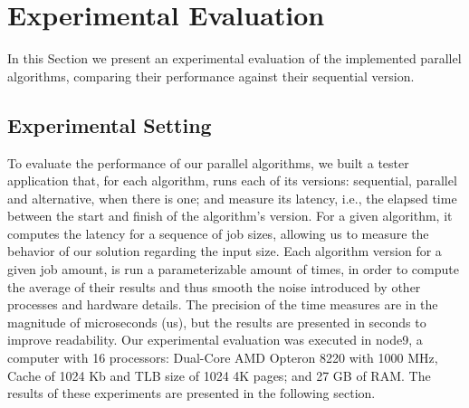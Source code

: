 \documentclass[conference,compsoc]{IEEEtran}
\begin{document}


\section{Experimental Evaluation} \label{Experimental_Eval}
In this Section we present an experimental evaluation of the implemented parallel algorithms, comparing their performance against their sequential version.

\subsection{Experimental Setting}


To evaluate the performance of our parallel algorithms, we built a tester application that, for each algorithm, runs each of its versions: sequential, parallel and alternative, when there is one; and measure its latency, i.e., the elapsed time between the start and finish of the algorithm's version. For a given algorithm, it computes the latency for a sequence of job sizes, allowing us to measure the behavior of our solution regarding the input size. Each algorithm version for a given job amount, is run a parameterizable amount of times, in order to compute the average of their results and thus smooth the noise introduced by other processes and hardware details. The precision of the time measures are in the magnitude of microseconds (us), but the results are presented in seconds to improve readability.
Our experimental evaluation was executed in node9, a computer with 16 processors: Dual-Core AMD Opteron 8220 with 1000 MHz, Cache of 1024 Kb and
TLB size of 1024 4K pages; and 27 GB of RAM. The results of these experiments are presented in the following section.
\end{document}
